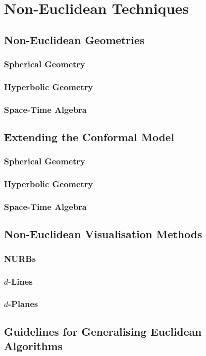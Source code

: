 \chapter{Non-Euclidean Techniques}

\section{Non-Euclidean Geometries}
\subsection{Spherical Geometry}
\subsection{Hyperbolic Geometry}
\subsection{Space-Time Algebra}

\section{Extending the Conformal Model}
\subsection{Spherical Geometry}
\subsection{Hyperbolic Geometry}
\subsection{Space-Time Algebra}
\section{Non-Euclidean Visualisation Methods}
\subsection{NURBs}
\subsection{$d$-Lines}
\subsection{$d$-Planes}
\section{Guidelines for Generalising Euclidean Algorithms}
